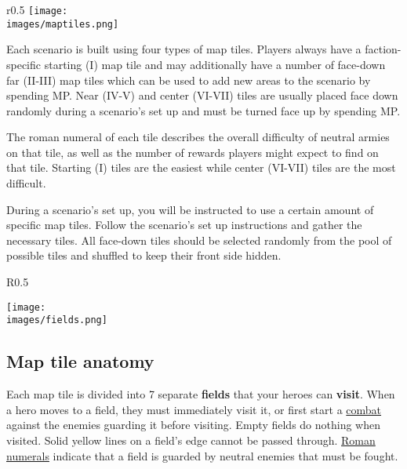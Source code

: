
\begin{wrapfigure}{r}{0.5\textwidth}
  \texttt{[image: \\images/maptiles.png]}
\end{wrapfigure}
Each scenario is built using four types of map tiles.
Players always have a faction-specific starting (I) map tile and may additionally have a number of face-down far (II-III) map tiles which can be used to add new areas to the scenario by spending MP.
Near (IV-V) and center (VI-VII) tiles are usually placed face down randomly during a scenario’s set up and must be turned face up by spending MP.\par
The roman numeral of each tile describes the overall difficulty of neutral armies on that tile, as well as the number of rewards players might expect to find on that tile.
Starting (I) tiles are the easiest while center (VI-VII) tiles are the most difficult.\par
During a scenario’s set up, you will be instructed to use a certain amount of specific map tiles.
Follow the scenario’s set up instructions and gather the necessary tiles.
All face-down tiles should be selected randomly from the pool of possible tiles and shuffled to keep their front side hidden.\par

\begin{wrapfigure}{R}{0.5\textwidth}
  \begin{center}
  \texttt{[image: \\images/fields.png]}
  \end{center}
\end{wrapfigure}
\subsection*{Map tile anatomy}
Each map tile is divided into 7 separate \textbf{fields} that your heroes can \textbf{visit}.
When a hero moves to a field, they must immediately visit it, or
first start a \hyperlink{Combat}{combat} against the enemies guarding it before visiting.
Empty fields do nothing when visited.
Solid yellow lines on a field's edge cannot be passed through.
\hyperlink{Difficulty}{Roman numerals} indicate that a field is guarded by neutral enemies that must be fought.\par

\clearpage

